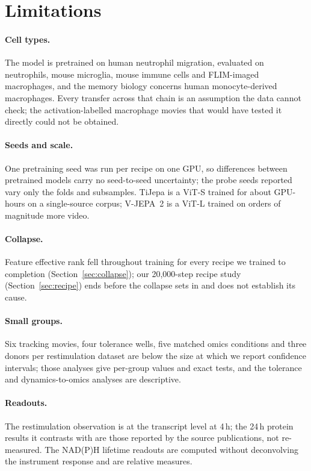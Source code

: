 \section{Limitations}
\label{sec:limitations}
\paragraph{Cell types.} The model is pretrained on human neutrophil migration, evaluated on
neutrophils, mouse microglia, mouse immune cells and FLIM-imaged macrophages, and the
memory biology concerns human monocyte-derived macrophages. Every transfer across that
chain is an assumption the data cannot check; the activation-labelled macrophage movies
that would have tested it directly could not be obtained.

\paragraph{Seeds and scale.} One pretraining seed was run per recipe on one GPU, so
differences between pretrained models carry no seed-to-seed uncertainty; the probe seeds
reported vary only the folds and subsamples. TiJepa is a ViT-S trained for about
 GPU-hours on a single-source corpus; V-JEPA~2 is a ViT-L trained on
orders of magnitude more video.

\paragraph{Collapse.} Feature effective rank fell throughout training for every recipe we
trained to completion (Section~\ref{sec:collapse}); our 20{,}000-step recipe study
(Section~\ref{sec:recipe}) ends before the collapse sets in and does not establish its cause.

\paragraph{Small groups.} Six tracking movies, four tolerance wells, five matched omics
conditions and three donors per restimulation dataset are below the size at which we
report confidence intervals; those analyses give per-group values and exact tests, and the
tolerance and dynamics-to-omics analyses are descriptive.

\paragraph{Readouts.} The restimulation observation is at the transcript level at 4\,h; the
24\,h protein results it contrasts with are those reported by the source publications, not
re-measured. The NAD(P)H lifetime readouts are computed without deconvolving the
instrument response and are relative measures.
